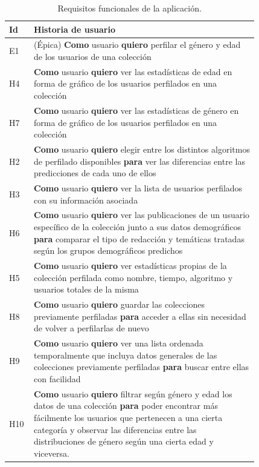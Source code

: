 \begin{table}[H]
{
    \setlength\arrayrulewidth{0.75pt}
    \setlength{\tabcolsep}{0.9\tabcolsep}

    \begin{tabular}{|p{0.04\linewidth} | p{0.78\linewidth}|}
    \hline
    \rowcolor{udcpink!25}
    Id & Historia de usuario \\ \hline
    E1 & (Épica) \textbf{Como} usuario \textbf{quiero} perfilar el género y edad de los usuarios de una colección \\ \hline
    H4 & \textbf{Como} usuario \textbf{quiero} ver las estadísticas de edad en forma de gráfico de los usuarios perfilados en una colección \\ \hline
    H7 & \textbf{Como} usuario \textbf{quiero} ver las estadísticas de género en forma de gráfico de los usuarios perfilados en una colección \\ \hline
    H2 & \textbf{Como} usuario \textbf{quiero} elegir entre los distintos algoritmos de perfilado disponibles \textbf{para} ver las diferencias entre las predicciones de cada uno de ellos \\ \hline
    H3 & \textbf{Como} usuario \textbf{quiero} ver la lista de usuarios perfilados con su información asociada \\ \hline

    H6 & \textbf{Como} usuario \textbf{quiero} ver las publicaciones de un usuario específico de la colección junto a sus datos demográficos \textbf{para} comparar el tipo de redacción y temáticas tratadas según los grupos demográficos predichos \\ \hline
    H5 & \textbf{Como} usuario \textbf{quiero} ver estadísticas propias de la colección perfilada como nombre, tiempo, algoritmo y usuarios totales de la misma \\ \hline
    H8 & \textbf{Como} usuario \textbf{quiero} guardar las colecciones previamente perfiladas \textbf{para} acceder a ellas sin necesidad de volver a perfilarlas de nuevo \\ \hline
    H9 & \textbf{Como} usuario \textbf{quiero} ver una lista ordenada temporalmente que incluya datos generales de las colecciones previamente perfiladas \textbf{para} buscar entre ellas con facilidad \\ \hline
    H10 & \textbf{Como} usuario \textbf{quiero} filtrar según género y edad los datos de una colección \textbf{para} poder encontrar más fácilmente los usuarios que pertenecen a una cierta categoría y observar las diferencias entre las distribuciones de género según una cierta edad y viceversa.\\ \hline
    
    \end{tabular}
}
    \caption{Requisitos funcionales de la aplicación.}
\label{tab:user-stories}
\end{table}

